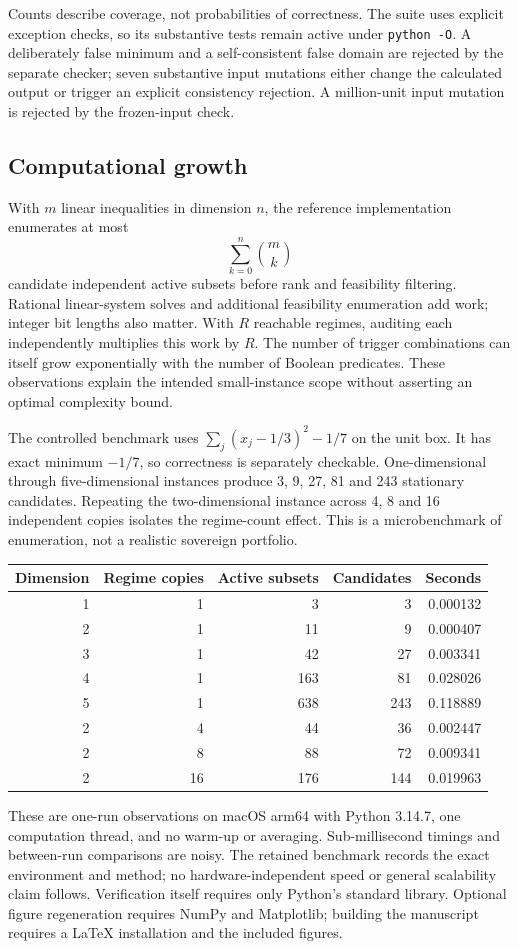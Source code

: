 \documentclass[11pt,a4paper]{article}
\begin{document}
\normalsize
Counts describe coverage, not probabilities of correctness. The suite uses explicit exception checks, so its substantive tests remain active under \texttt{python -O}. A deliberately false minimum and a self-consistent false domain are rejected by the separate checker; seven substantive input mutations either change the calculated output or trigger an explicit consistency rejection. A million-unit input mutation is rejected by the frozen-input check.

\subsection{Computational growth}
With $m$ linear inequalities in dimension $n$, the reference implementation enumerates at most
\[
\sum_{k=0}^{n}\binom{m}{k}
\]
candidate independent active subsets before rank and feasibility filtering. Rational linear-system solves and additional feasibility enumeration add work; integer bit lengths also matter. With $R$ reachable regimes, auditing each independently multiplies this work by $R$. The number of trigger combinations can itself grow exponentially with the number of Boolean predicates. These observations explain the intended small-instance scope without asserting an optimal complexity bound.

The controlled benchmark uses $\sum_j(x_j-1/3)^2-1/7$ on the unit box. It has exact minimum $-1/7$, so correctness is separately checkable. One-dimensional through five-dimensional instances produce 3, 9, 27, 81 and 243 stationary candidates. Repeating the two-dimensional instance across 4, 8 and 16 independent copies isolates the regime-count effect. This is a microbenchmark of enumeration, not a realistic sovereign portfolio.
\begin{center}\small
\begin{tabular}{rrrrr}\toprule
Dimension & Regime copies & Active subsets & Candidates & Seconds\\\midrule
1&1&3&3&0.000132\\
2&1&11&9&0.000407\\
3&1&42&27&0.003341\\
4&1&163&81&0.028026\\
5&1&638&243&0.118889\\
2&4&44&36&0.002447\\
2&8&88&72&0.009341\\
2&16&176&144&0.019963\\\bottomrule
\end{tabular}\normalsize
\end{center}
These are one-run observations on macOS arm64 with Python 3.14.7, one computation thread, and no warm-up or averaging. Sub-millisecond timings and between-run comparisons are noisy. The retained benchmark records the exact environment and method; no hardware-independent speed or general scalability claim follows. Verification itself requires only Python's standard library. Optional figure regeneration requires NumPy and Matplotlib; building the manuscript requires a LaTeX installation and the included figures.
\end{document}

